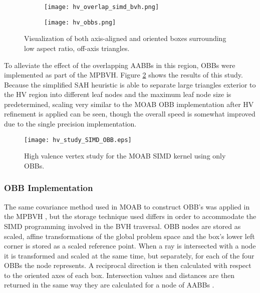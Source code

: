 \begin{figure}
  \centering
  \begin{subfigure}{.5\textwidth}
    \centering
    \texttt{[image: hv\_overlap\_simd\_bvh.png]}
  \end{subfigure}%
  \begin{subfigure}{.5\textwidth}
    \centering
    \texttt{[image: hv\_obbs.png]}
  \end{subfigure}
  \caption{Visualization of both axis-aligned and oriented boxes surrounding low
    aspect ratio, off-axis triangles.}
  \label{fig:hv_overlap_simd_bvh}
\end{figure}

To alleviate the effect of the overlapping AABBs in this region, OBBs were
implemented as part of the MPBVH. Figure \ref{fig:hv_study_simd_obbs} shows the
results of this study. Because the simplified SAH heuristic is able to separate
large triangles exterior to the HV region into different leaf nodes and the
maximum leaf node size is predetermined, scaling very similar to the MOAB OBB
implementation after HV refinement is applied can be seen, though the overall
speed is somewhat improved due to the single precision implementation.

\begin{figure}
  \centering
  \texttt{[image: hv\_study\_SIMD\_OBB.eps]}
  \caption{High valence vertex study for the MOAB SIMD kernel using only OBBs.}
  \label{fig:hv_study_simd_obbs}
\end{figure}

\subsubsection{OBB Implementation}

The same covariance method used in MOAB to construct OBB's was applied in the
MPBVH \cite{Weghorst_1984}, but the storage technique used differs in order to
accommodate the SIMD programming involved in the BVH traversal. OBB nodes are
stored as scaled, affine transformations of the global problem space and the
box's lower left corner is stored as a scaled reference point. When a ray is
intersected with a node it is transformed and scaled at the same time, but
separately, for each of the four OBBs the node represents. A reciprocal
direction is then calculated with respect to the oriented axes of each
box. Intersection values and distances are then returned in the same way they
are calculated for a node of AABBs \cite{Wald_2014}.

